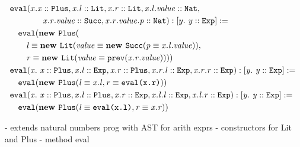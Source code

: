 \begin{align*}
&\texttt{eval}(x. \mathit{x} :: \mathit{\texttt{Plus}},
                  \mathit{x.l} :: \mathit{\texttt{Lit}},
                  \mathit{x.r} :: \mathit{\texttt{Lit}},
                  \mathit{x.l.value} :: \mathit{\texttt{Nat}},\\
&\qquad\qquad
                  \mathit{x.r.value} :: \mathit{\texttt{Succ}},
                  \mathit{x.r.value.p} :: \mathit{\texttt{Nat}}
              ): [y.\ \mathit{\mathit{y} :: \mathit{\texttt{Exp}}}] :=\\
&\quad\texttt{eval}(
           \textbf{new } \texttt{Plus}(\\
             &\qquad\mathit{l} \equiv \mathit{
               \textbf{new } \mathit{\texttt{Lit}}(\mathit{\mathit{value} \equiv \mathit{ \textbf{new } \mathit{\texttt{Succ}}(\mathit{\mathit{p} \equiv \mathit{x.l.value}})}})},\\
             &\qquad\mathit{r} \equiv \mathit{
               \textbf{new } \mathit{\texttt{Lit}}(\mathit{\mathit{value} \equiv \mathit{\texttt{prev}(x.r.\mathit{value})}})}
           )
         )\\
&\mathit{\texttt{eval}}(\mathit{x}.\ \mathit{\mathit{x} :: \mathit{\texttt{Plus}},
        \mathit{x.l} :: \mathit{\texttt{Exp}},
        \mathit{x.r} :: \mathit{\texttt{Plus}},
        \mathit{x.r.l} :: \mathit{\texttt{Exp}},
        \mathit{x.r.r} :: \mathit{\texttt{Exp}}}): \mathit{[y.\ \mathit{\mathit{y} :: \mathit{\texttt{Exp}}}]} := \mathit{}\\
       &\quad\texttt{eval}(
         \textbf{new } \mathit{\texttt{Plus}}(\mathit{
                     \mathit{l} \equiv \mathit{x.l},
                     \mathit{r} \equiv \mathit{\texttt{eval(x.r)}}
                   })
       )\\
&\mathit{\texttt{eval}}(\mathit{x}.\ \mathit{\mathit{x} :: \mathit{\texttt{Plus}},
        \mathit{x.l} :: \mathit{\texttt{Plus}},
        \mathit{x.r} :: \mathit{\texttt{Exp}},
        \mathit{x.l.l} :: \mathit{\texttt{Exp}},
        \mathit{x.l.r} :: \mathit{\texttt{Exp}}}): \mathit{[y.\ \mathit{\mathit{y} :: \mathit{\texttt{Exp}}}]} := \mathit{}\\
       &\quad\texttt{eval}(
         \textbf{new } \mathit{\texttt{Plus}}(\mathit{
                     \mathit{l} \equiv \mathit{\texttt{eval(x.l)}},
                     \mathit{r} \equiv \mathit{x.r}
                   })
       )
\end{align*}

- extends natural numbers prog with AST for arith exprs
- constructors for Lit and Plus
- method eval

